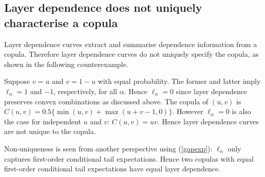\documentclass[authoryear]{elsarticle}
\newcommand{\E}{{\mathrm E}}
\newcommand{\de}{\mathrm{d}}
\newcommand{\eref}[1]{(\ref{#1})}
\begin{document}

\subsection{Layer dependence does not uniquely characterise a copula}


Layer dependence curves extract and summarise dependence information from a copula. Therefore layer dependence curves do not uniquely specify the copula, as shown in the following counterexample.

Suppose $v=u$ and $v=1-u$ with equal probability. The former and latter imply $\ell_\alpha=1$ and $-1$, respectively, for all $\alpha$. Hence $\ell_\alpha=0$ since layer dependence preserves convex combinations as discussed above. The copula of $(u,v)$ is $C(u,v)=0.5\{\min(u,v)+\max(u+v-1,0)\}$. However $\ell_\alpha=0$ is also the case for independent $u$ and $v$: $C(u,v)=uv$. Hence layer dependence curves are not unique to the copula.

Non-uniqueness is seen from another perspective using \eref{gapexp}: $\ell_\alpha$ only captures first-order conditional tail expectations. Hence two copulas with equal first-order conditional tail expectations have equal layer dependence.

\end{document}

